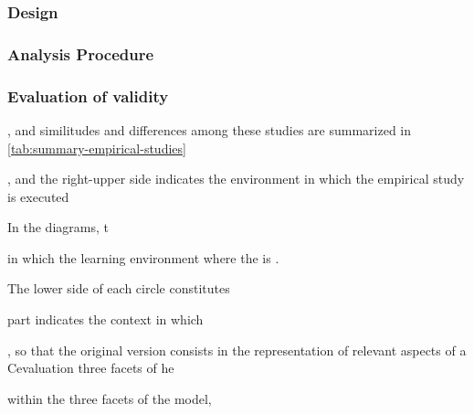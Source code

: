 \subsubsection{Design}

\subsubsection{Analysis Procedure}


\subsubsection{Evaluation of validity}




, and similitudes and differences among these studies are summarized in \autoref{tab:summary-empirical-studies}


, and the right-upper side indicates the environment in which the empirical study is executed


In the diagrams, t

in which the learning environment where the  is .


The lower side of each circle constitutes 

 part indicates the context in which 

, so that the original version consists in the representation of relevant aspects of a Cevaluation  three facets of he

within the three facets of the model, 

